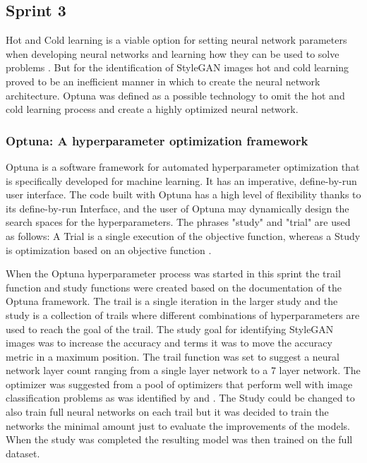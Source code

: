 \subsection{Sprint 3}

Hot and Cold learning is a viable option for setting neural network parameters when developing neural networks and learning how they can be used to solve problems \citep{Trask2019}. But for the identification of StyleGAN images hot and cold learning proved to be an inefficient manner in which to create the neural network architecture. Optuna was defined as a possible technology to omit the hot and cold learning process and create a highly optimized neural network.  

\subsubsection{Optuna: A hyperparameter optimization framework}

Optuna is a software framework for automated hyperparameter optimization that is specifically developed for machine learning. It has an imperative, define-by-run user interface. The code built with Optuna has a high level of flexibility thanks to its define-by-run Interface, and the user of Optuna may dynamically design the search spaces for the hyperparameters. The phrases "study" and "trial" are used as follows: A Trial is a single execution of the objective function, whereas a Study is optimization based on an objective function \citep{optuna2019}.

When the Optuna hyperparameter process was started in this sprint the trail function and study functions were created based on the documentation of the Optuna framework. The trail is a single iteration in the larger study and the study is a collection of trails where different combinations of hyperparameters are used to reach the goal of the trail. The study goal for identifying StyleGAN images was to increase the accuracy and \cite{optuna2019} terms it was to move the accuracy metric in a maximum position. The trail function was set to suggest a neural network layer count ranging from a single layer network to a 7 layer network. The optimizer was suggested from a pool of optimizers that perform well with image classification problems as was identified by \cite{bera2020analysis} and \cite{kandel2020comparative}. The Study could be changed to also train full neural networks on each trail but it was decided to train the networks the minimal amount just to evaluate the improvements of the models. When the study was completed the resulting model was then trained on the full dataset.

